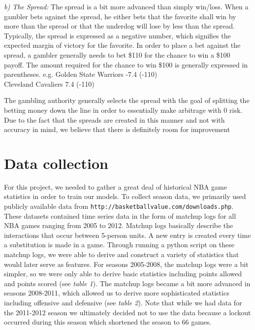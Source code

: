 \documentclass{article}
\begin{document}
\textit{b) The Spread:} The spread is a bit more advanced than simply win/loss. When a gambler bets against the spread, he either bets that the favorite shall win by more than the spread or that the underdog will lose by less than the spread. Typically, the spread is expressed as a negative number, which signifies the expected margin of victory for the favorite. In order to place a bet against the spread, a gambler generally needs to bet \$110 for the chance to win a \$100 payoff. The amount required for the chance to win \$100 is generally expressed in parentheses.
e.g. Golden State Warriors -7.4 (-110) \\
     Cleveland Cavaliers 7.4 (-110)

The gambling authority generally selects the spread with the goal of splitting the betting money down the line in order to essentially make arbitrage with 0 risk. Due to the fact that the spreads are created in this manner and not with accuracy in mind, we believe that there is definitely room for improvement

\section{Data collection}
For this project, we needed to gather a great deal of historical NBA game statistics in order to train our models. To collect season data, we primarily used publicly available data from \texttt{http://basketballvalue.com/downloads.php}.
These datasets contained time series data in the form of matchup logs for all NBA games ranging from 2005 to 2012. Matchup logs basically describe the interactions that occur between 5-person units. A new entry is created every time a substitution is made in a game. Through running a python script on these matchup logs, we were able to derive and construct a variety of statistics that would later serve as features. For seasons 2005-2008, the matchup logs were a bit simpler, so we were only able to derive basic statistics including points allowed and points scored (see \textit{table 1}). The matchup logs became a bit more advanced in seasons 2008-2011, which allowed us to derive more sophisticated statistics including offensive and defensive (see \textit{table 2}). Note that while we had data for the 2011-2012 season we ultimately decided not to use the data because a lockout occurred during this season which shortened the season to 66 games.
\end{document}
